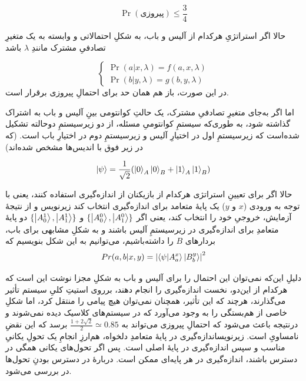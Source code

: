 \begin{equation}
    \label{معادله:بل-بازی}
    \Pr(\text{پیروزی}) \le \frac{3}{4}
\end{equation}

حالا اگر استراتژیِ هرکدام از آلیس و باب، به شکلِ احتمالاتی و وابسته به یک متغیرِ تصادفیِ مشترک مانندِ 
\(\lambda\)
باشد

\begin{equation}
\begin{cases}
    \Pr(a | x, \lambda) = f(a, x, \lambda) \\
    \Pr(b | y, \lambda) = g(b, y, \lambda)
\end{cases}
\end{equation}
در این صورت، باز هم همان حد برای احتمالِ پیروزی برقرار است.

اما اگر به‌جای متغیرِ تصادفیِ مشترک، یک حالتِ کوانتومی بینِ آلیس و باب به اشتراک گذاشته شود، به طوری‌که سیستمِ کوانتومیِ مسئله، از دو زیرسیستمِ دوحالته تشکیل شده‌است که زیرسیستمِ اول در اختیارِ آلیس و زیرسیستمِ دوم در اختیارِ باب است. (که در زیر فوق با اندیس‌ها مشخص شده‌اند)

\begin{equation}
    \ket\psi = \frac{1}{\sqrt{2}} (\ket{0}_A\ket{0}_B + \ket{1}_A\ket{1}_B) 
\end{equation}

حالا اگر برای تعیینِ استراتژی هرکدام از بازیکنان از اندازه‌گیری استفاده کنند، یعنی با توجه به ورودی
(\(x\) و \(y\))
یک پایهٔ متعامد برای اندازه‌گیری انتخاب کند ‌زیرنویس و از نتیجهٔ آزمایش، خروجیِ خود را انتخاب کند، یعنی اگر
\( \{\ket{A^0_0}, \ket{A^0_1} \} \)
و 
\( \{\ket{A^1_0}, \ket{A^1_1} \} \)
دو پایهٔ متعامدِ برای اندازه‌گیری در زیرسیستمِ آلیس باشند و به شکلِ مشابهی برای باب، بردارهای 
\(B\)
را داشته‌باشیم، می‌توانیم به این شکل بنویسیم که
\begin{equation}
    Pr(a, b | x, y) = \abs{\bra\psi \ket{A^x_a} \ket{B^y_b}}^2
\end{equation}

دلیلِ این‌که نمی‌توان این احتمال را برای آلیس و باب به شکلِ مجزا نوشت این است که هرکدام از این‌دو، نخست اندازه‌گیری را انجام دهند، برروی استیتِ کلیِ سیستم تأثیر می‌گذارند، هرچند که این تأثیر، همچنان نمی‌توان هیچ پیامی را منتقل کرد، اما شکلِ خاصی از هم‌بستگی را به وجود می‌آورد که در سیستم‌های کلاسیک دیده نمی‌شوند و درنتیجه باعث می‌شود که احتمالِ پیروزی می‌تواند به 
\( \frac{1 + 2\sqrt{2}}{2} \simeq 0.85 \)
برسد که این نقضِ نامساویِ  است.
‌زیرنویس{اندازه‌گیری در پایهٔ متعامدِ دلخواه، هم‌ارزِ انجامِ یک تحولِ یکانیِ مناسب و سپس اندازه‌گیری در پایهٔ اصلی است. پس اگر تحول‌های یکانی همگی در دسترس باشند، اندازه‌گیری در هر پایه‌ای ممکن است. دربارهٔ در دسترس بودنِ تحول‌ها در  بررسی می‌شود.}

